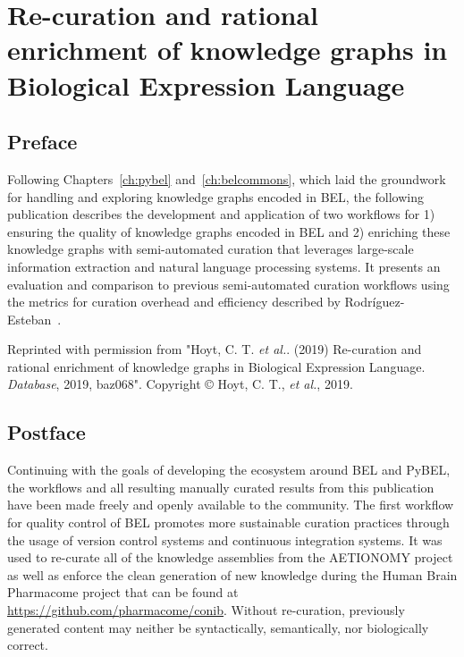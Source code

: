 \chapter{Re-curation and rational enrichment of knowledge graphs in Biological Expression Language}
\label{ch:recuration}

\section*{Preface}

Following Chapters~\ref{ch:pybel} and~\ref{ch:belcommons}, which laid the groundwork for handling and exploring knowledge graphs encoded in \ac{BEL}, the following publication describes the development and application of two workflows for 1) ensuring the quality of knowledge graphs encoded in \ac{BEL} and 2) enriching these knowledge graphs with semi-automated curation that leverages large-scale information extraction and natural language processing systems.
It presents an evaluation and comparison to previous semi-automated curation workflows using the metrics for curation overhead and efficiency described by Rodr\'{i}guez-Esteban~\cite{Rodriguez-Esteban2015}.

\vspace*{\fill}

Reprinted with permission from "Hoyt, C. T. \textit{et al.}. (2019) Re-curation and rational enrichment of knowledge graphs in Biological Expression Language. \textit{Database}, 2019, baz068".
Copyright © Hoyt, C. T., \textit{et al.}, 2019.



\section*{Postface}

Continuing with the goals of developing the ecosystem around \ac{BEL} and PyBEL, the workflows and all resulting manually curated results from this publication have been made freely and openly available to the community.
The first workflow for quality control of \ac{BEL} promotes more sustainable curation practices through the usage of version control systems and continuous integration systems.
It was used to re-curate all of the knowledge assemblies from the AETIONOMY project as well as enforce the clean generation of new knowledge during the Human Brain Pharmacome project that can be found at \url{https://github.com/pharmacome/conib}.
Without re-curation, previously generated content may neither be syntactically, semantically, nor biologically correct.

